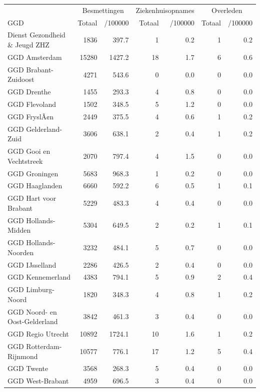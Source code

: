 \documentclass[
  english,
  man,floatsintext]{apa6}
\begin{document}
\begin{table}
\centering\begingroup\fontsize{10}{12}\selectfont

\begin{threeparttable}
\begin{tabular}{lrrrrrr}
\toprule
\multicolumn{1}{c}{ } & \multicolumn{2}{c}{Besmettingen} & \multicolumn{2}{c}{Ziekenhuisopnames} & \multicolumn{2}{c}{Overleden} \\
\cmidrule(l{3pt}r{3pt}){2-3} \cmidrule(l{3pt}r{3pt}){4-5} \cmidrule(l{3pt}r{3pt}){6-7}
GGD & Totaal & /100000 & Totaal & /100000 & Totaal & /100000\\
\midrule
Dienst Gezondheid \& Jeugd ZHZ & 1836 & 397.7 & 1 & 0.2 & 1 & 0.2\\
GGD Amsterdam & 15280 & 1427.2 & 18 & 1.7 & 6 & 0.6\\
GGD Brabant-Zuidoost & 4271 & 543.6 & 0 & 0.0 & 0 & 0.0\\
GGD Drenthe & 1455 & 293.3 & 4 & 0.8 & 0 & 0.0\\
GGD Flevoland & 1502 & 348.5 & 5 & 1.2 & 0 & 0.0\\
GGD FryslÃ¢n & 2449 & 375.5 & 4 & 0.6 & 1 & 0.2\\
GGD Gelderland-Zuid & 3606 & 638.1 & 2 & 0.4 & 1 & 0.2\\
GGD Gooi en Vechtstreek & 2070 & 797.4 & 4 & 1.5 & 0 & 0.0\\
GGD Groningen & 5683 & 968.3 & 1 & 0.2 & 0 & 0.0\\
GGD Haaglanden & 6660 & 592.2 & 6 & 0.5 & 1 & 0.1\\
GGD Hart voor Brabant & 5229 & 483.3 & 4 & 0.4 & 0 & 0.0\\
GGD Hollands-Midden & 5304 & 649.5 & 2 & 0.2 & 1 & 0.1\\
GGD Hollands-Noorden & 3232 & 484.1 & 5 & 0.7 & 0 & 0.0\\
GGD IJsselland & 2286 & 426.5 & 2 & 0.4 & 0 & 0.0\\
GGD Kennemerland & 4383 & 794.1 & 5 & 0.9 & 2 & 0.4\\
GGD Limburg-Noord & 1820 & 348.3 & 4 & 0.8 & 1 & 0.2\\
GGD Noord- en Oost-Gelderland & 3842 & 461.3 & 3 & 0.4 & 0 & 0.0\\
GGD Regio Utrecht & 10892 & 1724.1 & 10 & 1.6 & 1 & 0.2\\
GGD Rotterdam-Rijnmond & 10577 & 776.1 & 17 & 1.2 & 5 & 0.4\\
GGD Twente & 3568 & 268.3 & 5 & 0.4 & 0 & 0.0\\
GGD West-Brabant & 4959 & 696.5 & 3 & 0.4 & 0 & 0.0\\

\end{tabular}
\end{threeparttable}
\end{table}
\end{document}
